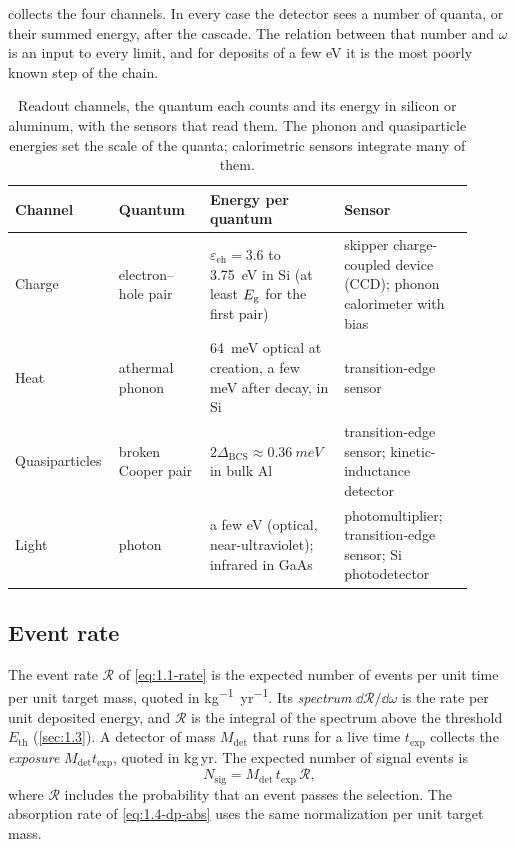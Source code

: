  collects the four channels. In every case the detector sees a number of quanta, or their summed energy, after the cascade. The relation between that number and $\omega$ is an input to every limit, and for deposits of a few eV it is the most poorly known step of the chain.

\begin{table}[tbp]
  \caption{Readout channels, the quantum each counts and its energy in silicon or aluminum, with the sensors that read them. The phonon and quasiparticle energies set the scale of the quanta; calorimetric sensors integrate many of them.}
  \label{tab:1-quanta}
  \centering\small
  \begin{tabular}{@{}>{\raggedright\arraybackslash}p{0.16\linewidth}>{\raggedright\arraybackslash}p{0.19\linewidth}>{\raggedright\arraybackslash}p{0.29\linewidth}>{\raggedright\arraybackslash}p{0.27\linewidth}@{}}
    \toprule
    Channel & Quantum & Energy per quantum & Sensor \\
    \midrule
    Charge & electron--hole pair & $\varepsilon_{\mathrm{eh}} = 3.6$ to \SI{3.75}{eV} in Si (at least $E_{\mathrm{g}}$ for the first pair) & skipper charge-coupled device (CCD); phonon calorimeter with bias \\
    Heat & athermal phonon & \SI{64}{meV} optical at creation, a few meV after decay, in Si & transition-edge sensor \\
    Quasiparticles & broken Cooper pair & $2\Delta_{\mathrm{BCS}} \approx \SI{0.36}{meV}$ in bulk Al & transition-edge sensor; kinetic-inductance detector \\
    Light & photon & a few eV (optical, near-ultraviolet); infrared in GaAs & photomultiplier; transition-edge sensor; Si photodetector \\
    \bottomrule
  \end{tabular}
\end{table}

\subsection{Event rate}\label{sec:1.5-rate}

The event rate $\mathcal{R}$ of \cref{eq:1.1-rate} is the expected number of events per unit time per unit target mass, quoted in \si{kg^{-1}.yr^{-1}}. Its \emph{spectrum} $\dd\mathcal{R}/\dd\omega$ is the rate per unit deposited energy, and $\mathcal{R}$ is the integral of the spectrum above the threshold $E_{\mathrm{th}}$ (\cref{sec:1.3}). A detector of mass $M_{\mathrm{det}}$ that runs for a live time $t_{\mathrm{exp}}$ collects the \emph{exposure} $M_{\mathrm{det}}t_{\mathrm{exp}}$, quoted in kg\,yr. The expected number of signal events is
\begin{equation}
  N_{\mathrm{sig}} = M_{\mathrm{det}}\,t_{\mathrm{exp}}\,\mathcal{R} ,
  \label{eq:1.5-Nsig}
\end{equation}
where $\mathcal{R}$ includes the probability that an event passes the selection. The absorption rate of \cref{eq:1.4-dp-abs} uses the same normalization per unit target mass.

